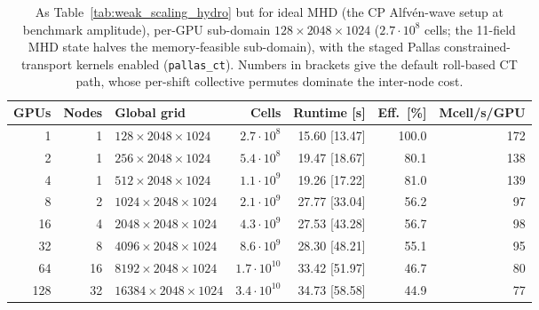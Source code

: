 \begin{table}
    \centering
    \caption{As Table~\ref{tab:weak_scaling_hydro} but for ideal MHD (the
    CP Alfv\'en-wave setup at benchmark amplitude), per-GPU sub-domain
    $128\times2048\times1024$ ($2.7\cdot10^{8}$ cells; the 11-field MHD
    state halves the memory-feasible sub-domain), with the staged
    Pallas constrained-transport kernels enabled
    (\texttt{pallas\_ct}).  Numbers in brackets give the default
    roll-based CT path, whose per-shift collective permutes dominate the
    inter-node cost.}
    \label{tab:weak_scaling_mhd}
    \begin{tabular}{rrlrrrr}
        \toprule
        GPUs & Nodes & Global grid & Cells & Runtime [s] & Eff.\ [\%] & Mcell/s/GPU \\
        \midrule
        1 & 1 & $128\times2048\times1024$ & $2.7\cdot10^{8}$ & 15.60 [13.47] & 100.0 & 172 \\
        2 & 1 & $256\times2048\times1024$ & $5.4\cdot10^{8}$ & 19.47 [18.67] & 80.1 & 138 \\
        4 & 1 & $512\times2048\times1024$ & $1.1\cdot10^{9}$ & 19.26 [17.22] & 81.0 & 139 \\
        8 & 2 & $1024\times2048\times1024$ & $2.1\cdot10^{9}$ & 27.77 [33.04] & 56.2 & 97 \\
        16 & 4 & $2048\times2048\times1024$ & $4.3\cdot10^{9}$ & 27.53 [43.28] & 56.7 & 98 \\
        32 & 8 & $4096\times2048\times1024$ & $8.6\cdot10^{9}$ & 28.30 [48.21] & 55.1 & 95 \\
        64 & 16 & $8192\times2048\times1024$ & $1.7\cdot10^{10}$ & 33.42 [51.97] & 46.7 & 80 \\
        128 & 32 & $16384\times2048\times1024$ & $3.4\cdot10^{10}$ & 34.73 [58.58] & 44.9 & 77 \\
        \bottomrule
    \end{tabular}
\end{table}

